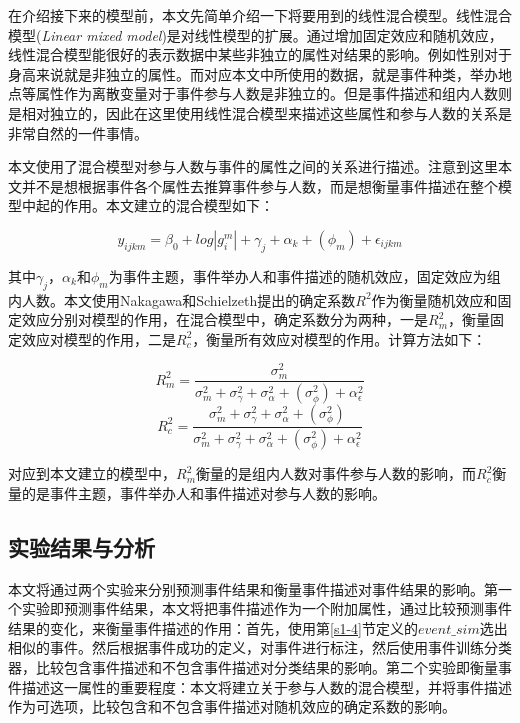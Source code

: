 在介绍接下来的模型前，本文先简单介绍一下将要用到的线性混合模型。线性混合模型(\textit{Linear mixed model})是对线性模型的扩展。通过增加固定效应和随机效应，线性混合模型能很好的表示数据中某些非独立的属性对结果的影响。例如性别对于身高来说就是非独立的属性。而对应本文中所使用的数据，就是事件种类，举办地点等属性作为离散变量对于事件参与人数是非独立的。但是事件描述和组内人数则是相对独立的，因此在这里使用线性混合模型来描述这些属性和参与人数的关系是非常自然的一件事情。

本文使用了混合模型对参与人数与事件的属性之间的关系进行描述。注意到这里本文并不是想根据事件各个属性去推算事件参与人数，而是想衡量事件描述在整个模型中起的作用。本文建立的混合模型如下：

\begin{equation}
y_{ijkm}=\beta_0+log|g_i^m|+\gamma_j+\alpha_k+ (\phi_m) +\epsilon_{ijkm}
\end{equation}

其中\(\gamma_j\)，\(\alpha_k\)和\(\phi_m\)为事件主题，事件举办人和事件描述的随机效应，固定效应为组内人数。本文使用Nakagawa和Schielzeth\citep{nakagawa_ageneralandsimplemethodforobtaining_2013}提出的确定系数\(R^2\)作为衡量随机效应和固定效应分别对模型的作用，在混合模型中，确定系数分为两种，一是\(R_m^2\)，衡量固定效应对模型的作用，二是\(R_c^2\)，衡量所有效应对模型的作用。计算方法如下：

\begin{equation}
R_m^2=\frac{\sigma_m^2}{\sigma_m^2+\sigma_\gamma^2+\sigma_\alpha^2+(\sigma_\phi^2)+\alpha_\epsilon^2}
\end{equation}
\begin{equation}
R_c^2=\frac{\sigma_m^2+\sigma_\gamma^2+\sigma_\alpha^2+(\sigma_\phi^2)}{\sigma_m^2+\sigma_\gamma^2+\sigma_\alpha^2+(\sigma_\phi^2)+\alpha_\epsilon^2}
\end{equation}

对应到本文建立的模型中，\(R_m^2\)衡量的是组内人数对事件参与人数的影响，而\(R_c^2\)衡量的是事件主题，事件举办人和事件描述对参与人数的影响。

\subsection{实验结果与分析}
本文将通过两个实验来分别预测事件结果和衡量事件描述对事件结果的影响。第一个实验即预测事件结果，本文将把事件描述作为一个附加属性，通过比较预测事件结果的变化，来衡量事件描述的作用：首先，使用第\ref{s1-4}节定义的\(event\_sim\)选出相似的事件。然后根据事件成功的定义，对事件进行标注，然后使用事件训练分类器，比较包含事件描述和不包含事件描述对分类结果的影响。第二个实验即衡量事件描述这一属性的重要程度：本文将建立关于参与人数的混合模型，并将事件描述作为可选项，比较包含和不包含事件描述对随机效应的确定系数的影响。

